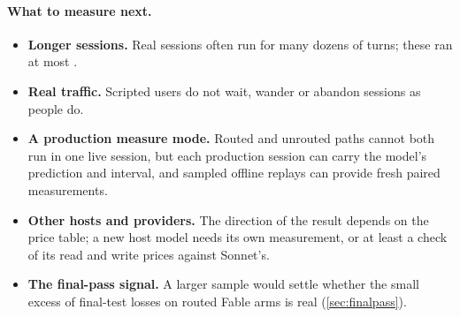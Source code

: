 \paragraph{What to measure next.}
\begin{itemize}
  \item \textbf{Longer sessions.} Real sessions often run for many dozens of turns; these ran at most
    \MaxTurns.
  \item \textbf{Real traffic.} Scripted users do not wait, wander or abandon sessions as people do.
  \item \textbf{A production measure mode.} Routed and unrouted paths cannot both run in one live session,
    but each production session can carry the model's prediction and interval, and sampled offline replays
    can provide fresh paired measurements.
  \item \textbf{Other hosts and providers.} The direction of the result depends on the price table; a new
    host model needs its own measurement, or at least a check of its read and write prices against Sonnet's.
  \item \textbf{The final-pass signal.} A larger sample would settle whether the small excess of final-test
    losses on routed Fable arms is real (\cref{sec:finalpass}).
\end{itemize}
